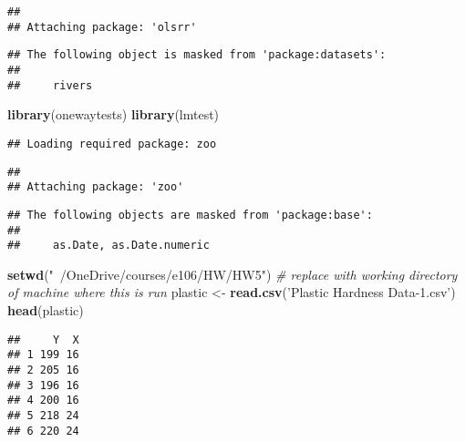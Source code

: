 \documentclass[
]{article}
\newenvironment{Shaded}{\begin{snugshade}}{\end{snugshade}}
\newcommand{\CommentTok}[1]{\textcolor[rgb]{0.56,0.35,0.01}{\textit{#1}}}
\newcommand{\KeywordTok}[1]{\textcolor[rgb]{0.13,0.29,0.53}{\textbf{#1}}}
\newcommand{\NormalTok}[1]{#1}
\newcommand{\OperatorTok}[1]{\textcolor[rgb]{0.81,0.36,0.00}{\textbf{#1}}}
\newcommand{\StringTok}[1]{\textcolor[rgb]{0.31,0.60,0.02}{#1}}
\begin{document}
\begin{verbatim}
## 
## Attaching package: 'olsrr'
\end{verbatim}

\begin{verbatim}
## The following object is masked from 'package:datasets':
## 
##     rivers
\end{verbatim}

\begin{Shaded}
\begin{Highlighting}[]
\KeywordTok{library}\NormalTok{(onewaytests)}
\KeywordTok{library}\NormalTok{(lmtest)}
\end{Highlighting}
\end{Shaded}

\begin{verbatim}
## Loading required package: zoo
\end{verbatim}

\begin{verbatim}
## 
## Attaching package: 'zoo'
\end{verbatim}

\begin{verbatim}
## The following objects are masked from 'package:base':
## 
##     as.Date, as.Date.numeric
\end{verbatim}

\begin{Shaded}
\begin{Highlighting}[]
\KeywordTok{setwd}\NormalTok{(}\StringTok{"~/OneDrive/courses/e106/HW/HW5"}\NormalTok{) }\CommentTok{# replace with working directory of machine where this is run}
\NormalTok{plastic <-}\StringTok{ }\KeywordTok{read.csv}\NormalTok{(}\StringTok{'Plastic Hardness Data-1.csv'}\NormalTok{)}
\KeywordTok{head}\NormalTok{(plastic)}
\end{Highlighting}
\end{Shaded}

\begin{verbatim}
##     Y  X
## 1 199 16
## 2 205 16
## 3 196 16
## 4 200 16
## 5 218 24
## 6 220 24
\end{verbatim}

\begin{Shaded}
\end{Shaded}
\end{document}
